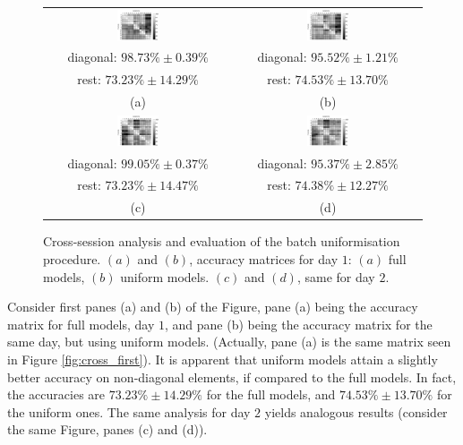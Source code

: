 \begin{figure}[!ht] \centering
  \begin{tabular}{cc}
    \includegraphics[width=0.23\textwidth]{figs/fig_resCross1_full.eps} &
    \includegraphics[width=0.23\textwidth]{figs/fig_resCross1.eps} \\
    diagonal: $98.73\% \pm 0.39\%$  & diagonal: $95.52\% \pm 1.21\%$ \\
        rest: $73.23\% \pm 14.29\%$ & rest: $74.53\% \pm 13.70\%$ \\
    (a) & (b) \\[5mm]
    \includegraphics[width=0.23\textwidth]{figs/fig_resCross2_full.eps} &
    \includegraphics[width=0.23\textwidth]{figs/fig_resCross2.eps} \\
    diagonal: $99.05\% \pm 0.37\%$ & diagonal: $95.37\% \pm 2.85\%$ \\
        rest: $73.23\% \pm 14.47\%$ & rest: $74.38\% \pm 12.27\%$ \\
    (c) & (d) \\
  \end{tabular}
  \caption{Cross-session analysis and evaluation of the batch uniformisation
    procedure. $(a)$ and $(b)$, accuracy matrices for day $1$: $(a)$
    full models, $(b)$ uniform models. $(c)$ and $(d)$, same for day $2$.}
  \label{fig:cross_initial}
\end{figure}

Consider first panes (a) and (b) of the Figure, pane (a) being the
accuracy matrix for full models, day $1$, and pane (b) being the
accuracy matrix for the same day, but using uniform models. (Actually,
pane (a) is the same matrix seen in Figure \ref{fig:cross_first}). It
is apparent that uniform models attain a slightly better accuracy on
non-diagonal elements, if compared to the full models. In fact, the
accuracies are $73.23\% \pm 14.29\%$ for the full models, and $74.53\%
\pm 13.70\%$ for the uniform ones. The same analysis for day $2$
yields analogous results (consider the same Figure, panes (c) and
(d)).

